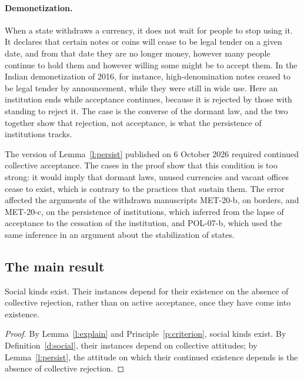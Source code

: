 \documentclass{situationist-preprint}
\begin{document}
\paragraph{Demonetization.} When a state withdraws a currency, it does not wait for people to stop using it. It declares that certain notes or coins will cease to be legal tender on a given date, and from that date they are no longer money, however many people continue to hold them and however willing some might be to accept them. In the Indian demonetization of 2016, for instance, high-denomination notes ceased to be legal tender by announcement, while they were still in wide use. Here an institution ends while acceptance continues, because it is rejected by those with standing to reject it. The case is the converse of the dormant law, and the two together show that rejection, not acceptance, is what the persistence of institutions tracks.

\begin{remark}
The version of Lemma~\ref{l:persist} published on 6 October 2026 required continued collective acceptance. The cases in the proof show that this condition is too strong: it would imply that dormant laws, unused currencies and vacant offices cease to exist, which is contrary to the practices that sustain them. The error affected the arguments of the withdrawn manuscripts MET-20-b, on borders, and MET-20-c, on the persistence of institutions, which inferred from the lapse of acceptance to the cessation of the institution, and POL-07-b, which used the same inference in an argument about the stabilization of states.
\end{remark}

\subsection{The main result}

\begin{theorem}\label{t:main}
Social kinds exist. Their instances depend for their existence on the absence of collective rejection, rather than on active acceptance, once they have come into existence.
\end{theorem}

\begin{proof}
By Lemma~\ref{l:explain} and Principle~\ref{p:criterion}, social kinds exist. By Definition~\ref{d:social}, their instances depend on collective attitudes; by Lemma~\ref{l:persist}, the attitude on which their continued existence depends is the absence of collective rejection.
\end{proof}
\end{document}
